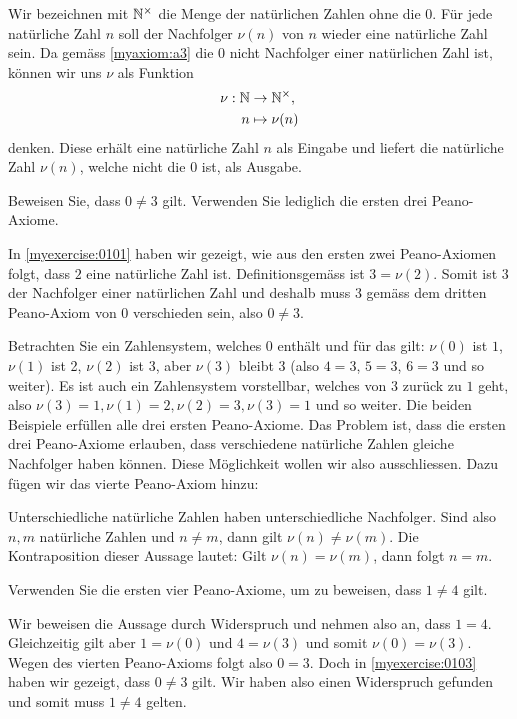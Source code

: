 \begin{myremark}\label{myremark:Nunit}
	Wir bezeichnen mit $\mathbb{N}^{\times}$ die Menge der natürlichen Zahlen ohne die $0$.
	Für jede natürliche Zahl $n$ soll der Nachfolger $\nu(n)$ von $n$ wieder eine natürliche Zahl sein.
	Da gemäss \cref{myaxiom:a3} die $0$ nicht Nachfolger einer natürlichen Zahl ist, können wir uns $\nu$ als Funktion
	\begin{align*}
		\nu: \mathbb{N} & \to\mathbb{N}^{\times},     \\
		n       & \mapsto \nu(n)
	\end{align*}
	denken. Diese erhält eine natürliche Zahl $n$ als Eingabe und liefert die natürliche Zahl $\nu(n)$, welche nicht die $0$ ist, als Ausgabe.
\end{myremark}
\begin{myexercise}\label{myexercise:0103}
	Beweisen Sie, dass $0\neq 3$ gilt. Verwenden Sie lediglich die ersten drei Peano-Axiome.
	\begin{myanswer}
		In \cref{myexercise:0101} haben wir gezeigt, wie aus den ersten zwei Peano-Axiomen folgt, dass $2$ eine natürliche Zahl ist.
		Definitionsgemäss ist $3=\nu(2)$.
		Somit ist $3$ der Nachfolger einer natürlichen Zahl und deshalb muss $3$ gemäss dem dritten Peano-Axiom von $0$ verschieden sein, also $0\neq 3$.
	\end{myanswer}
\end{myexercise}
\noindent
Betrachten Sie ein Zahlensystem, welches $0$ enthält und für das gilt: $\nu(0)$ ist $1$, $\nu(1)$ ist 2, $\nu(2)$ ist $3$, aber $\nu(3)$ bleibt $3$ (also $4=3$, $5=3$, $6=3$ und so weiter). Es ist auch ein Zahlensystem vorstellbar, welches von $3$ zurück zu $1$ geht, also $\nu(3)=1, \nu(1)=2, \nu(2)=3, \nu(3)=1$ und so weiter. Die beiden Beispiele erfüllen alle drei ersten Peano-Axiome. Das Problem ist, dass die ersten drei Peano-Axiome erlauben, dass verschiedene natürliche Zahlen gleiche Nachfolger haben können. Diese Möglichkeit wollen wir also ausschliessen. Dazu fügen wir das vierte Peano-Axiom hinzu:
\begin{myaxiom}\label{myaxiom:a4}
	Unterschiedliche natürliche Zahlen haben unterschiedliche Nachfolger.
	Sind also $n,m$ natürliche Zahlen und $n\neq m$, dann gilt $\nu(n)\neq\nu(m)$.
	Die Kontraposition dieser Aussage lautet: Gilt $\nu(n)=\nu(m)$, dann folgt $n=m$.
\end{myaxiom}
\begin{myexercise}\label{myexercise:0104}
	Verwenden Sie die ersten vier Peano-Axiome, um zu beweisen, dass $1\neq 4$ gilt.
	\begin{myanswer}
		Wir beweisen die Aussage durch Widerspruch und nehmen also an, dass $1=4$.
		Gleichzeitig gilt aber $1=\nu(0)$ und $4=\nu(3)$ und somit $\nu(0)=\nu(3)$.
		Wegen des vierten Peano-Axioms folgt also $0=3$.
		Doch in \cref{myexercise:0103} haben wir gezeigt, dass $0\neq 3$ gilt.
		Wir haben also einen Widerspruch gefunden und somit muss $1\neq 4$ gelten.
	\end{myanswer}
\end{myexercise}
